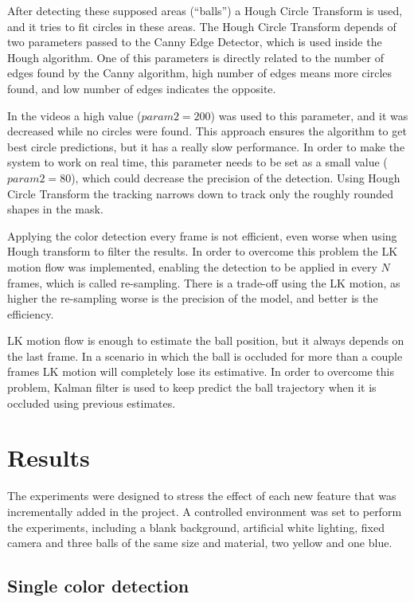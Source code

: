 \documentclass[10pt,twocolumn,letterpaper]{article}
\begin{document}
After detecting these supposed areas (``balls'') a Hough Circle Transform  is used, and it tries to fit circles in these areas. The Hough Circle Transform depends of two parameters passed to the Canny Edge Detector, which is used inside the Hough algorithm.  One of this parameters is directly related to the number of edges found by the Canny algorithm, high number of edges means more circles found, and low number of edges indicates the opposite.

In the videos a high value ($param2 = 200$) was used to this parameter, and it was decreased while no circles were found. This approach ensures the algorithm to get best circle predictions, but it has a really slow performance. In order to make the system to work on real time, this parameter needs to be set as a small value ($param2 = 80$), which could decrease the precision of the detection. Using Hough Circle Transform the tracking narrows down to track only the roughly rounded shapes in the mask.

Applying the color detection every frame is not efficient, even worse when using Hough transform to filter the results. In order to overcome this problem the LK motion flow was implemented, enabling the detection to be applied  in every $N$ frames, which is called re-sampling. There is a trade-off using the LK motion, as higher the re-sampling worse is the precision of the model, and better is the efficiency.

LK motion flow is enough to estimate the ball position, but it always depends on the last frame. In a scenario in which the ball is occluded for more than a couple frames  LK motion will completely lose its estimative. In order to overcome this problem, Kalman filter is used to keep predict the ball trajectory when it is occluded using previous estimates.

\section{Results}\label{sec:result}

The experiments were designed to stress the effect of each new feature that was incrementally added in the project. A controlled environment was set to perform the experiments, including a blank background, artificial white lighting, fixed camera and three balls of the same size and material, two yellow and one blue.

\subsection{Single color detection}
\end{document}
